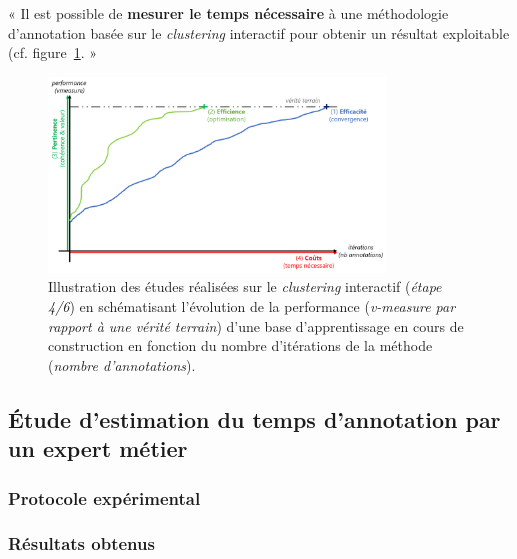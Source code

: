 		\begin{tcolorbox}[
			title=\textbf{Hypothèse sur les coûts},
			colback=gray!20,
			colframe=gray!50!black!75,
			width=\linewidth
		]
			« Il est possible de \textbf{mesurer le temps nécessaire} à une méthodologie d'annotation basée sur le \textit{clustering} interactif pour obtenir un résultat exploitable (cf. figure~\ref{figure:HYPOTHESE-COUTS}. »
			
			
			\begin{figure}[H]
				\centering
				\includegraphics[width=0.8\textwidth]{figures/hypotheses-04-couts}
				\caption{Illustration des études réalisées sur le \textit{clustering} interactif (\textit{étape 4/6}) en schématisant l'évolution de la performance (\textit{v-measure par rapport à une vérité terrain}) d'une base d'apprentissage en cours de construction en fonction du nombre d'itérations de la méthode (\textit{nombre d'annotations}).}
				\label{figure:HYPOTHESE-COUTS}
			\end{figure}

		\end{tcolorbox}
		
		\subsection{Étude d'estimation du temps d'annotation par un expert métier}
		
			\subsubsection{Protocole expérimental}

			\subsubsection{Résultats obtenus}

